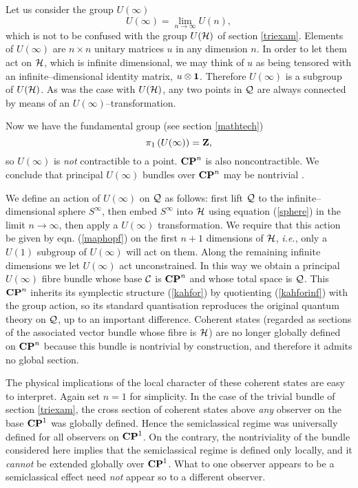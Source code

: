 \documentclass[a4paper,a4paper]{article}
\begin{document}
Let us consider the group $U(\infty)$ 
\begin{equation}
U(\infty)=\lim_{n\to\infty} U(n),
\label{uinfty}
\end{equation}
which is not to be confused with the group $U({\cal H})$ of section 
\ref{triexam}. Elements of $U(\infty)$ are $n\times n$ unitary matrices 
$u$ in any dimension $n$. In order to let them act on ${\cal H}$, 
which is infinite dimensional, we may think of $u$ as being tensored with 
an infinite--dimensional identity matrix, $u\otimes {\bf 1}$. 
Therefore  $U(\infty)$ is a subgroup of $U({\cal H})$. As was the case with
$U({\cal H})$, any two points in ${\cal Q}$ are always connected by means 
of an $U(\infty)$--transformation.

Now we have the fundamental group (see section \ref{mathtech})
\begin{equation}
\pi_1\left(U(\infty)\right)={\bf Z},
\label{homotop}
\end{equation}
so $U(\infty)$ is {\it not} contractible to a point. ${\bf CP}^n$ is also noncontractible. 
We conclude that principal $U(\infty)$ bundles over ${\bf CP}^n$ may be nontrivial 
\cite{STEENROD}. 

We define an action of $U(\infty)$ on ${\cal Q}$ as follows: first lift ${\cal Q}$ 
to the infinite--dimensional sphere $S^{\infty}$, then embed $S^{\infty}$ into ${\cal H}$ 
using equation (\ref{sphere}) in the limit $n\to\infty$, then apply a $U(\infty)$ transformation. 
We require that this action be given by eqn. (\ref{maphopf}) on the first $n+1$ dimensions 
of ${\cal H}$, {\it i.e.}, only a $U(1)$ subgroup of $U(\infty)$ will act on them. 
Along the remaining infinite dimensions we let $U(\infty)$ act unconstrained. 
In this way we obtain a principal $U(\infty)$ fibre bundle whose base ${\cal C}$ 
is ${\bf CP}^n$ and whose total space is ${\cal Q}$. This ${\bf CP}^n$ 
inherits its symplectic structure (\ref{kahfor}) by quotienting (\ref{kahforinf}) 
with the group action, so its standard quantisation reproduces the original 
quantum theory on ${\cal Q}$, up to an important difference.
Coherent states (regarded as sections of the associated 
vector bundle whose fibre is ${\cal H}$) are no longer globally defined on ${\bf CP}^n$ 
because this bundle is nontrivial by construction, and therefore it admits no global section. 

The physical implications of the local character of these coherent states
are easy to interpret. Again set $n=1$ for simplicity. In the case of the trivial 
bundle of section \ref{triexam}, the cross section of coherent states above {\it any}
observer on the base ${\bf CP}^1$ was globally defined. Hence the semiclassical 
regime was universally defined for all observers on ${\bf CP}^1$. On the 
contrary, the nontriviality of the bundle considered here 
implies that the semiclassical regime is defined only locally, and it 
{\it cannot} be extended globally over ${\bf CP}^1$. What to one observer  
appears to be a semiclassical effect  need {\it not} appear so to a different observer. 
\end{document}

